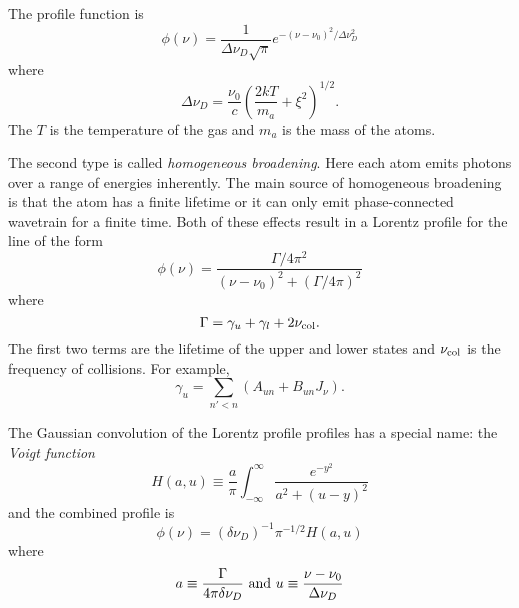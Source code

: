 The profile function is 
\begin{equation}
\phi(\nu) = \frac{1}{\Delta \nu_D \sqrt{\pi}} e^{-(\nu-\nu_0)^2/\Delta\nu_D^2}
\label{eq:565}
\end{equation}
where
\begin{equation}
\Delta \nu_D = \frac{\nu_0}{c} \left ( \frac{2kT}{m_a} + \xi^2 \right
)^{1/2}.
\label{eq:566}
\end{equation}
The $T$ is the temperature of the gas and $m_a$ is the mass of the
atoms. 

The second type is called {\em homogeneous broadening}.  Here each
atom emits photons over a range of energies inherently.  The main
source of homogeneous broadening is that the atom has a finite
lifetime or it can only emit phase-connected wavetrain for a finite
time.   Both of these effects result in a Lorentz profile for the
line of the form
\begin{equation}
\phi(\nu) = \frac{\Gamma/4\pi^2}{(\nu-\nu_0)^2 + (\Gamma/4\pi)^2}
\label{eq:567}
\end{equation}
where
\begin{equation}
\Gamma = \gamma_u + \gamma_l + 2 \nu_{\hbox{\rm \scriptsize col}}.
\label{eq:568}
\end{equation}
The first two terms are the lifetime of the upper and lower states and
$\nu_{\hbox{\rm \scriptsize col}}$ is the frequency of collisions.  For example,
\begin{equation}
\gamma_u = \sum_{n'<n} \left ( A_{un} + B_{un} J_\nu \right ).
\label{eq:569}
\end{equation}

The Gaussian convolution of the Lorentz profile  profiles has a special
name: the {\em Voigt function}
\begin{equation}
H(a,u) \equiv \frac{a}{\pi} \int_{-\infty}^\infty \frac{e^{-y^2}}{a^2+(u-y)^2}
\label{eq:570}
\end{equation}
and the combined profile is
\begin{equation}
\phi(\nu) = (\delta \nu_D)^{-1} \pi^{-1/2} H(a,u)
\label{eq:571}
\end{equation}
where
\begin{equation}
a \equiv \frac{\Gamma}{4\pi \delta \nu_D}
~\hbox{\rm and}~u\equiv\frac{\nu-\nu_0}{\Delta \nu_D}
\label{eq:572}
\end{equation}

